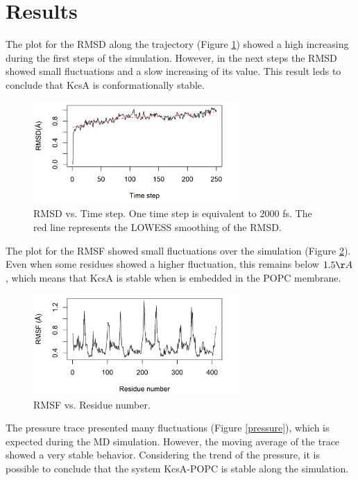 \documentclass[paper=letter, onecolum, fontsize=12pt]{article}
\begin{document}
\section{Results}

\hspace{4mm}The plot for the RMSD along the trajectory (Figure \ref{rmsd}) showed a high increasing during the first steps of the simulation. However, in the next steps the RMSD showed small fluctuations and a slow increasing of its value. This result leds to conclude that KcsA is conformationally stable.
\begin{figure}[H]
    \centering
    \includegraphics[width=0.7\textwidth]{rmsd.png}
    \caption{RMSD vs. Time step. One time step is equivalent to 2000 fs. The red line represents the LOWESS smoothing of the RMSD.}
    \label{rmsd}
\end{figure}
\vspace{-3mm}
 The plot for the RMSF showed small fluctuations over the simulation (Figure \ref{rmsf}). Even when some residues showed a higher fluctuation, this remains below $1.5 \AA$, which means that KcsA is stable when is embedded in the POPC membrane.
\begin{figure}[H]
    \centering
    \includegraphics[width=0.7\textwidth]{rmsf.png}
    \caption{RMSF vs. Residue number.}
    \label{rmsf}
\end{figure}
The pressure trace presented many fluctuations (Figure \ref{pressure}), which is expected during the MD simulation. However, the moving average of the trace showed a very stable behavior. Considering the trend of the pressure, it is possible to conclude that the system KcsA-POPC is stable along the simulation.
\end{document}
